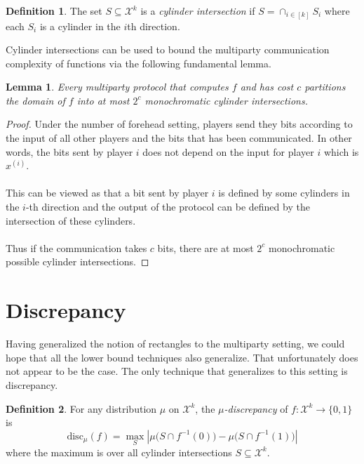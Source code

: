 \documentclass[11pt,oneside]{book}
\theoremstyle{plain}
\newtheorem{lemma}{Lemma}
\theoremstyle{definition}
\newtheorem{definition}{Definition}
\theoremstyle{plain}
\newcommand{\calX}{\mathcal{X}}
\newcommand{\disc}{\mathrm{disc}}
\begin{document}
	\begin{definition}
		The set $S \subseteq \calX^k$ is a \emph{cylinder intersection} if $S = \cap_{i \in [k]} S_i$ where each $S_i$ is a cylinder in the $i$th direction.
	\end{definition}
	
	Cylinder intersections can be used to bound the multiparty communication complexity of functions via the following fundamental lemma.
	
	\begin{lemma}
		Every multiparty protocol that computes $f$ and has cost $c$ partitions the domain of $f$ into at most $2^c$ monochromatic cylinder intersections.
	\end{lemma}
	
	\begin{proof}
		Under the number of forehead setting, players send they bits according to the input of all other players and the bits that has been communicated. In other words, the bits sent by player $i$ does not depend on the input for player $i$ which is $x^{(i)}$.\\
		\\
		This can be viewed as that a bit sent by player $i$ is defined by some cylinders in the $i$-th direction and the output of the protocol can be defined by the intersection of these cylinders.\\
		\\
		Thus if the communication takes $c$ bits, there are at most $2^c$ monochromatic possible cylinder intersections.
	\end{proof}
	
	
	
	 
	\section{Discrepancy}
	
	Having generalized the notion of rectangles to the multiparty setting, we could hope that all the lower bound techniques also generalize. That unfortunately does not appear to be the case. The only technique that generalizes to this setting is discrepancy.
	
	\begin{definition}
		For any distribution $\mu$ on $\calX^k$, 
		the \emph{$\mu$-discrepancy} of $f : \calX^k \to \{0,1\}$ is
		\[
		\disc_\mu(f) = \max_{S} 
		\left| \mu\big( S \cap f^{-1}(0) \big) - \mu\big( S \cap f^{-1}(1)\big) \right|
		\]
		where the maximum is over all cylinder intersections $S \subseteq \calX^k$.
	\end{definition}
	
\end{document}

